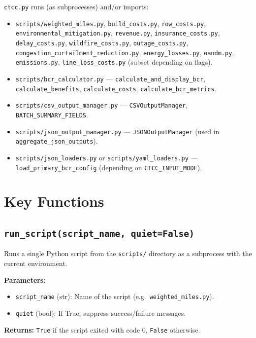 \documentclass[ctcc_full_documentation.tex]{subfiles}
\begin{document}
\texttt{ctcc.py} runs (as subprocesses) and/or imports:
\begin{itemize}
    \item \texttt{scripts/weighted\_miles.py}, \texttt{build\_costs.py}, \texttt{row\_costs.py}, \texttt{environmental\_mitigation.py}, \texttt{revenue.py}, \texttt{insurance\_costs.py}, \texttt{delay\_costs.py}, \texttt{wildfire\_costs.py}, \texttt{outage\_costs.py}, \texttt{congestion\_curtailment\_reduction.py}, \texttt{energy\_losses.py}, \texttt{oandm.py}, \texttt{emissions.py}, \texttt{line\_loss\_costs.py} (subset depending on flags).
    \item \texttt{scripts/bcr\_calculator.py} --- \texttt{calculate\_and\_display\_bcr}, \texttt{calculate\_benefits}, \texttt{calculate\_costs}, \texttt{calculate\_bcr\_metrics}.
    \item \texttt{scripts/csv\_output\_manager.py} --- \texttt{CSVOutputManager}, \texttt{BATCH\_SUMMARY\_FIELDS}.
    \item \texttt{scripts/json\_output\_manager.py} --- \texttt{JSONOutputManager} (used in \texttt{aggregate\_json\_outputs}).
    \item \texttt{scripts/json\_loaders.py} or \texttt{scripts/yaml\_loaders.py} --- \texttt{load\_primary\_bcr\_config} (depending on \texttt{CTCC\_INPUT\_MODE}).
\end{itemize}

\section{Key Functions}

\subsection{\texttt{run\_script(script\_name, quiet=False)}}

Runs a single Python script from the \texttt{scripts/} directory as a subprocess with the current environment.

\textbf{Parameters:}
\begin{itemize}
    \item \texttt{script\_name} (str): Name of the script (e.g.\ \texttt{weighted\_miles.py}).
    \item \texttt{quiet} (bool): If True, suppress success/failure messages.
\end{itemize}

\textbf{Returns:} \texttt{True} if the script exited with code 0, \texttt{False} otherwise.
\end{document}

